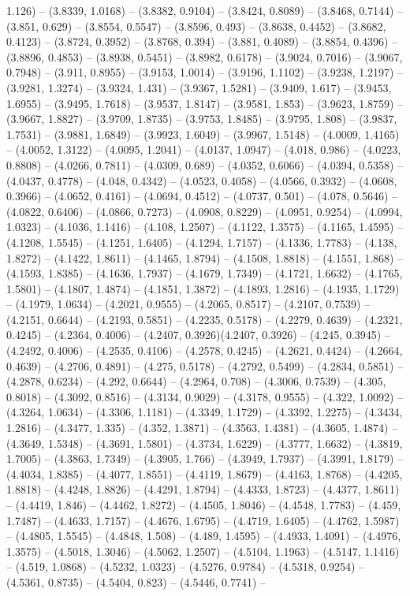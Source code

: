 1.126) -- (3.8339, 1.0168) -- (3.8382, 0.9104) -- (3.8424, 0.8089) -- (3.8468, 0.7144) -- (3.851, 0.629) -- (3.8554, 0.5547) -- (3.8596, 0.493) -- (3.8638, 0.4452) -- (3.8682, 0.4123) -- (3.8724, 0.3952) -- (3.8768, 0.394) -- (3.881, 0.4089) -- (3.8854, 0.4396) -- (3.8896, 0.4853) -- (3.8938, 0.5451) -- (3.8982, 0.6178) -- (3.9024, 0.7016) -- (3.9067, 0.7948) -- (3.911, 0.8955) -- (3.9153, 1.0014) -- (3.9196, 1.1102) -- (3.9238, 1.2197) -- (3.9281, 1.3274) -- (3.9324, 1.431) -- (3.9367, 1.5281) -- (3.9409, 1.617) -- (3.9453, 1.6955) -- (3.9495, 1.7618) -- (3.9537, 1.8147) -- (3.9581, 1.853) -- (3.9623, 1.8759) -- (3.9667, 1.8827) -- (3.9709, 1.8735) -- (3.9753, 1.8485) -- (3.9795, 1.808) -- (3.9837, 1.7531) -- (3.9881, 1.6849) -- (3.9923, 1.6049) -- (3.9967, 1.5148) -- (4.0009, 1.4165) -- (4.0052, 1.3122) -- (4.0095, 1.2041) -- (4.0137, 1.0947) -- (4.018, 0.986) -- (4.0223, 0.8808) -- (4.0266, 0.7811) -- (4.0309, 0.689) -- (4.0352, 0.6066) -- (4.0394, 0.5358) -- (4.0437, 0.4778) -- (4.048, 0.4342) -- (4.0523, 0.4058) -- (4.0566, 0.3932) -- (4.0608, 0.3966) -- (4.0652, 0.4161) -- (4.0694, 0.4512) -- (4.0737, 0.501) -- (4.078, 0.5646) -- (4.0822, 0.6406) -- (4.0866, 0.7273) -- (4.0908, 0.8229) -- (4.0951, 0.9254) -- (4.0994, 1.0323) -- (4.1036, 1.1416) -- (4.108, 1.2507) -- (4.1122, 1.3575) -- (4.1165, 1.4595) -- (4.1208, 1.5545) -- (4.1251, 1.6405) -- (4.1294, 1.7157) -- (4.1336, 1.7783) -- (4.138, 1.8272) -- (4.1422, 1.8611) -- (4.1465, 1.8794) -- (4.1508, 1.8818) -- (4.1551, 1.868) -- (4.1593, 1.8385) -- (4.1636, 1.7937) -- (4.1679, 1.7349) -- (4.1721, 1.6632) -- (4.1765, 1.5801) -- (4.1807, 1.4874) -- (4.1851, 1.3872) -- (4.1893, 1.2816) -- (4.1935, 1.1729) -- (4.1979, 1.0634) -- (4.2021, 0.9555) -- (4.2065, 0.8517) -- (4.2107, 0.7539) -- (4.2151, 0.6644) -- (4.2193, 0.5851) -- (4.2235, 0.5178) -- (4.2279, 0.4639) -- (4.2321, 0.4245) -- (4.2364, 0.4006) -- (4.2407, 0.3926)(4.2407, 0.3926) -- (4.245, 0.3945) -- (4.2492, 0.4006) -- (4.2535, 0.4106) -- (4.2578, 0.4245) -- (4.2621, 0.4424) -- (4.2664, 0.4639) -- (4.2706, 0.4891) -- (4.275, 0.5178) -- (4.2792, 0.5499) -- (4.2834, 0.5851) -- (4.2878, 0.6234) -- (4.292, 0.6644) -- (4.2964, 0.708) -- (4.3006, 0.7539) -- (4.305, 0.8018) -- (4.3092, 0.8516) -- (4.3134, 0.9029) -- (4.3178, 0.9555) -- (4.322, 1.0092) -- (4.3264, 1.0634) -- (4.3306, 1.1181) -- (4.3349, 1.1729) -- (4.3392, 1.2275) -- (4.3434, 1.2816) -- (4.3477, 1.335) -- (4.352, 1.3871) -- (4.3563, 1.4381) -- (4.3605, 1.4874) -- (4.3649, 1.5348) -- (4.3691, 1.5801) -- (4.3734, 1.6229) -- (4.3777, 1.6632) -- (4.3819, 1.7005) -- (4.3863, 1.7349) -- (4.3905, 1.766) -- (4.3949, 1.7937) -- (4.3991, 1.8179) -- (4.4034, 1.8385) -- (4.4077, 1.8551) -- (4.4119, 1.8679) -- (4.4163, 1.8768) -- (4.4205, 1.8818) -- (4.4248, 1.8826) -- (4.4291, 1.8794) -- (4.4333, 1.8723) -- (4.4377, 1.8611) -- (4.4419, 1.846) -- (4.4462, 1.8272) -- (4.4505, 1.8046) -- (4.4548, 1.7783) -- (4.459, 1.7487) -- (4.4633, 1.7157) -- (4.4676, 1.6795) -- (4.4719, 1.6405) -- (4.4762, 1.5987) -- (4.4805, 1.5545) -- (4.4848, 1.508) -- (4.489, 1.4595) -- (4.4933, 1.4091) -- (4.4976, 1.3575) -- (4.5018, 1.3046) -- (4.5062, 1.2507) -- (4.5104, 1.1963) -- (4.5147, 1.1416) -- (4.519, 1.0868) -- (4.5232, 1.0323) -- (4.5276, 0.9784) -- (4.5318, 0.9254) -- (4.5361, 0.8735) -- (4.5404, 0.823) -- (4.5446, 0.7741) -- 